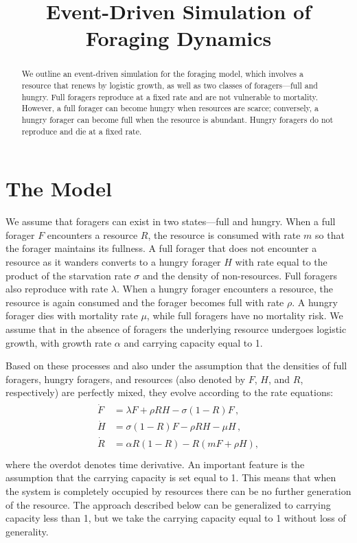 \documentclass[11pt]{iopart}
\begin{document}
\title{Event-Driven Simulation of Foraging Dynamics}


\begin{abstract}

  We outline an event-driven simulation for the foraging model, which
  involves a resource that renews by logistic growth, as well as two classes
  of foragers---full and hungry.  Full foragers reproduce at a fixed rate and
  are not vulnerable to mortality.  However, a full forager can become hungry
  when resources are scarce; conversely, a hungry forager can become full
  when the resource is abundant.  Hungry foragers do not reproduce and die at
  a fixed rate.
\end{abstract}


\section{The Model}

We assume that foragers can exist in two states---full and hungry.  When a
full forager $F$ encounters a resource $R$, the resource is consumed with
rate $m$ so that the forager maintains its fullness.  A full forager that
does not encounter a resource as it wanders converts to a hungry forager $H$
with rate equal to the product of the starvation rate $\sigma$ and the
density of non-resources.  Full foragers also reproduce with rate
$\lambda$. When a hungry forager encounters a resource, the resource is again
consumed and the forager becomes full with rate $\rho$.  A hungry forager
dies with mortality rate $\mu$, while full foragers have no mortality risk.
We assume that in the absence of foragers the underlying resource undergoes
logistic growth, with growth rate $\alpha$ and carrying capacity equal to 1.

Based on these processes and also under the assumption that the densities of
full foragers, hungry foragers, and resources (also denoted by $F$, $H$, and
$R$, respectively) are perfectly mixed, they evolve according to the rate
equations:
\begin{align}
  \label{RE}
\begin{split}
\dot F &= \lambda F + \rho  RH - \sigma (1-R)F\,,\\
\dot H &= \sigma (1-R)F - \rho RH - \mu H\,, \\
\dot R &= \alpha R(1-R) -  R(mF+\rho H),\\
\end{split}
\end{align}
where the overdot denotes time derivative.  An important feature is the
assumption that the carrying capacity is set equal to 1.  This means that
when the system is completely occupied by resources there can be no further
generation of the resource.  The approach described below can be generalized
to carrying capacity less than 1, but we take the carrying capacity equal to
1 without loss of generality.
\end{document}

